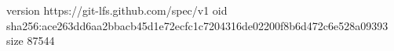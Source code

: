 version https://git-lfs.github.com/spec/v1
oid sha256:ace263dd6aa2bbacb45d1e72ecfc1c7204316de02200f8b6d472c6e528a09393
size 87544
